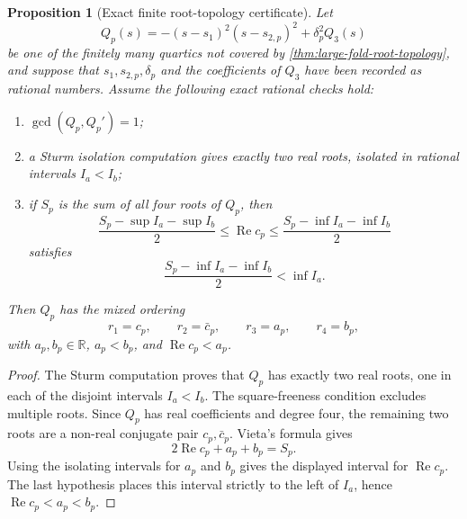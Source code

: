 \documentclass[11pt,a4paper]{article}
\theoremstyle{plain}
\newtheorem{proposition}[theorem]{Proposition}
\theoremstyle{definition}
\theoremstyle{remark}
\DeclareMathOperator{\Real}{Re}
\newcommand{\RR}{\mathbb{R}}
\begin{document}
\begin{proposition}[Exact finite root-topology certificate]
\label{prop:finite-root-topology-exact-certificate}
Let
\[
  Q_p(s)=-(s-s_1)^2(s-s_{2,p})^2+\delta_p^2Q_3(s)
\]
be one of the finitely many quartics not covered by
\cref{thm:large-fold-root-topology}, and suppose that
$s_1,s_{2,p},\delta_p$ and the coefficients of $Q_3$ have been
recorded as rational numbers.  Assume the following exact rational
checks hold:
\begin{enumerate}
  \item $\gcd(Q_p,Q_p')=1$;
  \item a Sturm isolation computation gives exactly two real roots,
    isolated in rational intervals $I_a<I_b$;
  \item if $S_p$ is the sum of all four roots of $Q_p$, then
    \[
      \frac{S_p-\sup I_a-\sup I_b}{2}
      \le \Real c_p \le
      \frac{S_p-\inf I_a-\inf I_b}{2}
    \]
    satisfies
    \[
      \frac{S_p-\inf I_a-\inf I_b}{2}<\inf I_a .
    \]
\end{enumerate}
Then $Q_p$ has the mixed ordering
\[
  r_1=c_p,\qquad r_2=\bar c_p,\qquad
  r_3=a_p,\qquad r_4=b_p,
\]
with $a_p,b_p\in\RR$, $a_p<b_p$, and $\Real c_p<a_p$.
\end{proposition}

\begin{proof}
The Sturm computation proves that $Q_p$ has exactly two real roots,
one in each of the disjoint intervals $I_a<I_b$.  The square-freeness
condition excludes multiple roots.  Since $Q_p$ has real coefficients
and degree four, the remaining two roots are a non-real conjugate pair
$c_p,\bar c_p$.  Vieta's formula gives
\[
  2\Real c_p+a_p+b_p=S_p.
\]
Using the isolating intervals for $a_p$ and $b_p$ gives the displayed
interval for $\Real c_p$.  The last hypothesis places this interval
strictly to the left of $I_a$, hence $\Real c_p<a_p<b_p$.
\end{proof}
\end{document}
